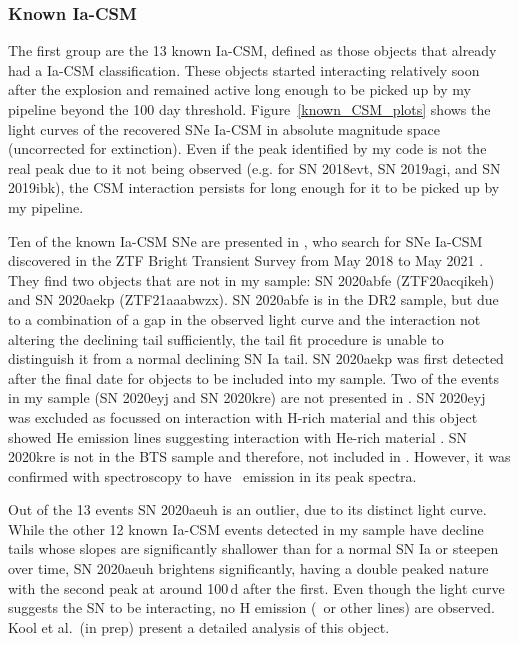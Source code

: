 \documentclass[a4paper,oneside,12pt, class=Latex/Classes/PhDthesisPSnPDF, crop=false]{standalone}
\begin{document}
\subsubsection{Known Ia-CSM}
\label{known-iacsm}
The first group are the 13 known Ia-CSM, defined as those objects that already had a Ia-CSM classification. These objects started interacting relatively soon after the explosion and remained active long enough to be picked up by my pipeline beyond the 100 day threshold. Figure~\ref{known_CSM_plots} shows the light curves of the recovered SNe Ia-CSM in absolute magnitude space (uncorrected for extinction). Even if the peak identified by my code is not the real peak due to it not being observed (e.g. for SN 2018evt, SN 2019agi, and SN 2019ibk), the CSM interaction persists for long enough for it to be picked up by my pipeline.

Ten of the known Ia-CSM SNe are presented in \citet{Ia-CSM_BTS}, who search for SNe Ia-CSM discovered in the ZTF Bright Transient Survey from May 2018 to May 2021 \cite[BTS;][]{BTS-I, BTS-II}. They find two objects that are not in my sample: SN 2020abfe (ZTF20acqikeh) and SN 2020aekp (ZTF21aaabwzx). SN 2020abfe is in the DR2 sample, but due to a combination of a gap in the observed light curve and the interaction not altering the declining tail sufficiently, the tail fit procedure is unable to distinguish it from a normal declining SN Ia tail. SN 2020aekp was first detected after the final date for objects to be included into my sample. Two of the events in my sample (SN 2020eyj and SN 2020kre) are not presented in \citet{Ia-CSM_BTS}. SN 2020eyj was excluded as \citet{Ia-CSM_BTS} focussed on interaction with H-rich material and this object showed He emission lines suggesting interaction with He-rich material \citep{Kool_He_CSM}. SN 2020kre is not in the BTS sample and therefore, not included in \cite{Ia-CSM_BTS}. However, it was confirmed with spectroscopy to have \Halpha~emission in its peak spectra.

Out of the 13 events SN 2020aeuh is an outlier, due to its distinct light curve. While the other 12 known Ia-CSM events detected in my sample have decline tails whose slopes are significantly shallower than for a normal SN Ia or steepen over time, SN 2020aeuh brightens significantly, having a double peaked nature with the second peak at around 100\,d after the first. Even though the light curve suggests the SN to be interacting, no H emission (\Halpha~or other lines) are observed. Kool et al.~(in prep) present a detailed analysis of this object. 
\end{document}
